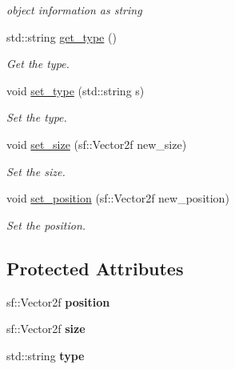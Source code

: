 \begin{DoxyCompactItemize}
\begin{DoxyCompactList}\small\item\em object information as string \end{DoxyCompactList}\item 
std\+::string \hyperlink{classdrawable_a329e564296d591dc8bd2f6dc5a205213}{get\+\_\+type} ()
\begin{DoxyCompactList}\small\item\em Get the type. \end{DoxyCompactList}\item 
void \hyperlink{classdrawable_aa019787b726542ca470fb817251e7b09}{set\+\_\+type} (std\+::string s)
\begin{DoxyCompactList}\small\item\em Set the type. \end{DoxyCompactList}\item 
void \hyperlink{classdrawable_a34b6b50f342c41f550f09e0465f95f61}{set\+\_\+size} (sf\+::\+Vector2f new\+\_\+size)
\begin{DoxyCompactList}\small\item\em Set the size. \end{DoxyCompactList}\item 
void \hyperlink{classdrawable_a5e40f2621daaca4ac32ef26b8c01b9a6}{set\+\_\+position} (sf\+::\+Vector2f new\+\_\+position)
\begin{DoxyCompactList}\small\item\em Set the position. \end{DoxyCompactList}\end{DoxyCompactItemize}
\subsection*{Protected Attributes}
\begin{DoxyCompactItemize}
\item 
\mbox{\label{classdrawable_a34679fa5ae82eee65dfd6b1b9f3c7cb6}} 
sf\+::\+Vector2f {\bfseries position}
\item 
\mbox{\label{classdrawable_aa3900dd7b69b439a3514e6acdb4a17b9}} 
sf\+::\+Vector2f {\bfseries size}
\item 
\mbox{\label{classdrawable_ad5a982912d20a94b0e69de86cc9b53cb}} 
std\+::string {\bfseries type}
\end{DoxyCompactItemize}


